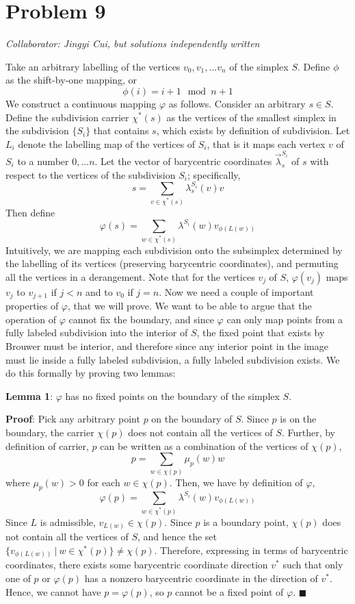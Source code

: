 \documentclass[10pt,letter]{article}
\begin{document}
\section*{Problem 9}
\textit{Collaborator: Jingyi Cui, but solutions independently written}

Take an arbitrary labelling of the vertices $v_0, v_1, ... v_n$ of the simplex $S$. Define $\phi$ as the shift-by-one mapping, or \[ \phi(i) = i + 1 \mod {n+1} \]
We construct a continuous mapping $\varphi$ as follows. Consider an arbitrary $s \in S$. Define the subdivision carrier $\chi^*(s)$ as the vertices of the smallest simplex in the subdivision $\{ S_i \}$ that contains $s$, which exists by definition of subdivision. Let $L_i$ denote the labelling map of the vertices of $S_i$, that is it maps each vertex $v$ of $S_i$ to a number $0, ... n$. Let the vector of barycentric coordinates $\vec{\lambda}^{S_i}_s$ of $s$ with respect to the vertices of the subdivision $S_i$; specifically,
\[ s = \sum_{v \in \chi^*(s) } \lambda^{S_i}_s(v) v  \]
Then define
\[ \varphi(s) = \sum_{w \in \chi^*(s) } \lambda^{S_i}(w) v_{\phi(L(w))} \]
Intuitively, we are mapping each subdivision onto the subsimplex determined by the labelling of its vertices (preserving barycentric coordinates), and permuting all the vertices in a derangement. Note that for the vertices $v_j$ of $S$, $\varphi(v_j)$ maps $v_j$ to $v_{j+1}$ if $j < n$ and to $v_0$ if $j=n$. Now we need a couple of important properties of $\varphi$, that we will prove. We want to be able to argue that the operation of $\varphi$ cannot fix the boundary, and since $\varphi$ can only map points from a fully labeled subdivision into the interior of $S$, the fixed point that exists by Brouwer must be interior, and therefore since any interior point in the image must lie inside a fully labeled subdivision, a fully labeled subdivision exists. We do this formally by proving two lemmas:

\textbf{Lemma 1}: $\varphi$ has no fixed points on the boundary of the simplex $S$.

\textbf{Proof}:  Pick any arbitrary point $p$ on the boundary of $S$. Since $p$ is on the boundary, the carrier $\chi(p)$ does not contain all the vertices of $S$. Further, by definition of carrier, $p$ can be written as a combination of the vertices of $\chi(p)$,
\[ p = \sum_{w \in \chi(p)} \mu_p(w)w  \]
where $\mu_p(w) > 0$ for each $w \in \chi(p)$. Then, we have by definition of $\varphi$,
\[ \varphi(p) = \sum_{w \in \chi^*(p) } \lambda^{S_i}(w) v_{\phi(L(w))} \]
Since $L$ is admissible, $v_{L(w)} \in \chi(p)$. Since $p$ is a boundary point, $\chi(p)$ does not contain all the vertices of $S$, and hence the set $\{ v_{\phi(L(w))} \ | \ w \in \chi^*(p)\} \neq \chi(p) $. Therefore, expressing in terms of barycentric coordinates, there exists some barycentric coordinate direction $v^*$ such that only one of $p$ or $\varphi(p)$ has a nonzero barycentric coordinate in the direction of $v^*$. Hence, we cannot have $p = \varphi(p)$, so $p$ cannot be a fixed point of $\varphi$. $\blacksquare$ \\
\end{document}
